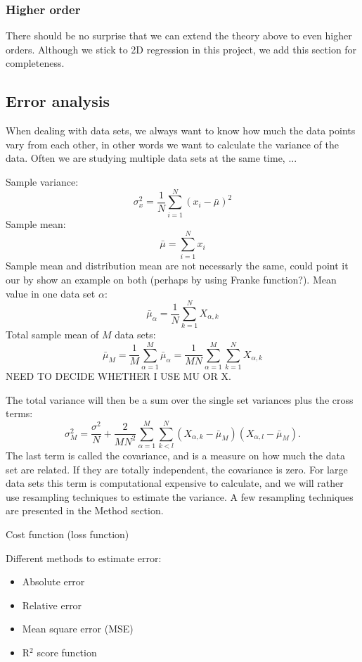 \subsubsection{Higher order}
There should be no surprise that we can extend the theory above to even higher orders. 
Although we stick to 2D regression in this project, we add this section for completeness. 


\subsection{Error analysis} \label{error_analysis}
When dealing with data sets, we always want to know how much the data points vary from each other, in other words we want to calculate the variance of the data. Often we are studying multiple data sets at the same time, ...

Sample variance:
\begin{equation}
\sigma_x^2=\frac{1}{N}\sum_{i=1}^N(x_i-\bar{\mu})^2
\end{equation}
Sample mean:
\begin{equation}
\bar{\mu}=\sum_{i=1}^Nx_i
\end{equation}
Sample mean and distribution mean are not necessarly the same, could point it our by show an example on both (perhaps by using Franke function?).
Mean value in one data set $\alpha$:
\begin{equation}
\bar{\mu}_{\alpha}=\frac{1}{N}\sum_{k=1}^NX_{\alpha,k}
\end{equation}
Total sample mean of $M$ data sets:
\begin{equation}
\bar{\mu}_M=\frac{1}{M}\sum_{\alpha=1}^M\bar{\mu}_{\alpha}=\frac{1}{MN}\sum_{\alpha=1}^M\sum_{k=1}^NX_{\alpha,k}
\end{equation}
NEED TO DECIDE WHETHER I USE MU OR X.

The total variance will then be a sum over the single set variances plus the cross terms:
\begin{equation}
\sigma_M^2=\frac{\sigma^2}{N}+\frac{2}{MN^2}\sum_{\alpha=1}^M\sum_{k<l}^N(X_{\alpha,k}-\bar{\mu}_M)(X_{\alpha,l}-\bar{\mu}_M).
\end{equation}
The last term is called the covariance, and is a measure on how much the data set are related. If they are totally independent, the covariance is zero. For large data sets this term is computational expensive to calculate, and we will rather use resampling techniques to estimate the variance. A few resampling techniques are presented in the Method section.

Cost function (loss function) 

Different methods to estimate error:
\begin{itemize}
\item{Absolute error}
\item{Relative error}
\item{Mean square error (MSE)}
\item{R$^2$ score function}
\end{itemize}

